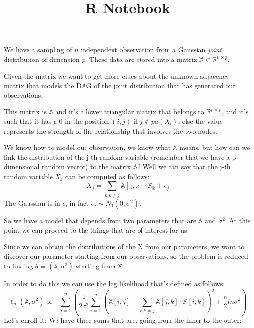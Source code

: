 \documentclass[
]{article}
\title{R Notebook}
\author{}
\date{\vspace{-2.5em}}
\begin{document}
\maketitle

We have a sampling of \(n\) independent observation from a Gaussian
\emph{joint} distribution of dimension \(p\). These data are stored into
a matrix \(\mathbb{X} \in \mathbb{R}^{n\times p}\).

Given the matrix we want to get more clues about the unknown adjacency
matrix that models the DAG of the joint distribution that has generated
our observations.

This matrix is \(\mathbb{A}\) and it's a lower triangular matrix that
belongs to \(\mathbb{R}^{p\times p}\), and it's such that it has a 0 in
the position \((i,j)\) if \(j \not\in pa(X_i)\), else the value
represents the strength of the relationship that involves the two nodes.

We know how to model our observation, we know what \(\mathbb{A}\) means,
but how can we link the distribution of the j-th random variable
(remember that we have a p-dimensional random vector) to the matrix
\(\mathbb{A}\)? Well we can say that the j-th random variable \(X_j\)
can be computed as follows: \begin{equation}
  X_j = \sum_{k | k \neq j}\mathbb{A[j,k]\cdot X_k}+\epsilon_j
\end{equation} The Gaussian is in \(\epsilon\), in fact
\(\epsilon_j \sim N_1(0, \sigma^2)\).

So we have a model that depends from two parameters that are
\(\mathbb{A}\) and \(\sigma^2\). At this point we can proceed to the
things that are of interest for us.

Since we can obtain the distributions of the X from our parameters, we
want to discover our parameter starting from our observations, so the
problem is reduced to finding \(\theta = (\mathbb{A}, \sigma^2)\)
starting from \(\mathbb{X}\).

In order to do this we can use the log likelihood that's defined as
follows: \begin{equation}
  \mathcal{\ell}_n(\mathbb{A}, \sigma^2) \propto - \sum_{j=1}^p \left (\frac{1}{2\sigma^2} \sum_{i=1}^n \left( \mathbb{X}[i,j] - \sum_{k | k\neq j} \mathbb{A}[j,k]\cdot \mathbb{X}[i,k]\right)^2 + \frac{n}{2}ln\sigma^2 \right)
\end{equation} Let's enroll it: We have three sums that are, going from
the inner to the outer:
\end{document}
